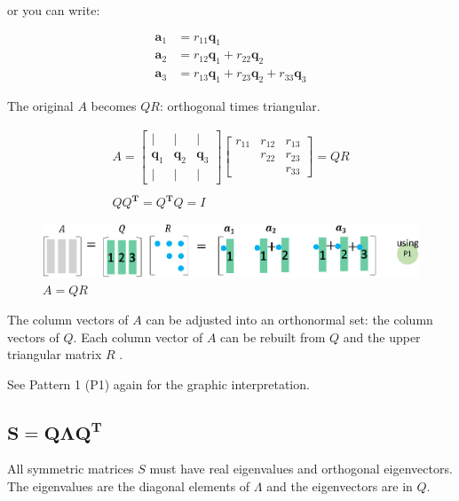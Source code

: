 \documentclass[letterpaper]{article}
\begin{document}
or you can write:

\begin{align*}
  \bm{a}_1 &= r_{11}\bm{q}_1\\
  \bm{a}_2 &= r_{12}\bm{q}_1 + r_{22} \bm{q}_2\\
  \bm{a}_3 &= r_{13}\bm{q}_1 + r_{23} \bm{q}_2 + r_{33} \bm{q}_3
\end{align*}

The original $A$ becomes $QR$: orthogonal times triangular.

\begin{gather*}
  A = 
  \begin{bmatrix}
    | & | & |\\
    \bm{q}_1 & \bm{q}_2 & \bm{q}_3\\
    | & | & |
  \end{bmatrix}
  \begin{bmatrix}
    r_{11} & r_{12} & r_{13}\\
           & r_{22} & r_{23}\\
           &        & r_{33}
  \end{bmatrix} = QR\\
  \\
  Q Q^\mathbf{T}=Q^\mathbf{T} Q = I
\end{gather*}

\begin{figure}[H]
  \includegraphics[keepaspectratio, width=\linewidth]{QR.eps}
  \caption{$A=QR$}
\end{figure}

The column vectors of $A$ can be adjusted into an orthonormal set: the column vectors of $Q$.
Each column vector of $A$ can be rebuilt from $Q$ and the upper triangular matrix $R$ .

See Pattern 1 (P1) again for the graphic interpretation.


\clearpage

\subsection{$\boldsymbol{S=Q \Lambda Q^\mathbf{T}}$}

All symmetric matrices $S$ must have real eigenvalues and orthogonal eigenvectors.
The eigenvalues are the diagonal elements of $\Lambda$ and the eigenvectors are in $Q$. 
\end{document}
